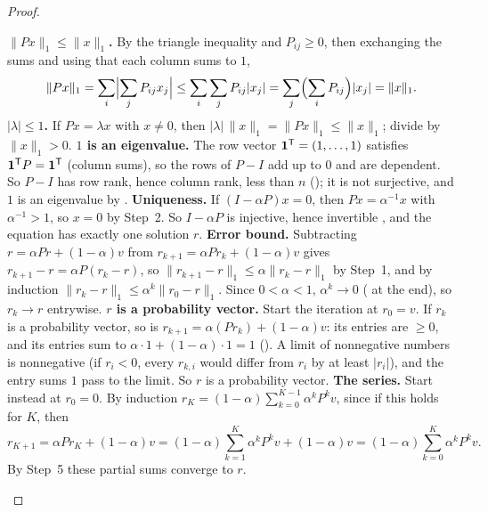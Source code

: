\documentclass[10pt]{scrartcl}
\newcommand{\one}{\mathbf 1}
\begin{document}
\begin{proof}
  \begin{steps}
    \ii \textbf{$\|Px\|_1\le\|x\|_1$.} By the triangle inequality and $P_{ij}\ge0$, then exchanging the sums and using that each column sums to $1$,
    \[
      \|Px\|_1=\sum_{i}\Bigl|\sum_{j} P_{ij}x_j\Bigr|\le\sum_{i}\sum_{j} P_{ij}|x_j|=\sum_{j}\Bigl(\sum_{i} P_{ij}\Bigr)|x_j|=\|x\|_1 .
    \]
    \ii \textbf{$|\lambda|\le1$.} If $Px=\lambda x$ with $x\ne 0$, then $|\lambda|\,\|x\|_1=\|Px\|_1\le\|x\|_1$; divide by $\|x\|_1>0$.
    \ii \textbf{$1$ is an eigenvalue.} The row vector $\one^{\T}=(1,\dots,1)$ satisfies $\one^{\T}P=\one^{\T}$ (column sums), so the rows of $P-I$ add up to $0$ and are dependent. So $P-I$ has row rank, hence column rank, less than $n$ (); it is not surjective, and $1$ is an eigenvalue by .
    \ii \textbf{Uniqueness.} If $(I-\alpha P)x=0$, then $Px=\alpha^{-1}x$ with $\alpha^{-1}>1$, so $x=0$ by Step~2. So $I-\alpha P$ is injective, hence invertible , and the equation has exactly one solution $r$.
    \ii \textbf{Error bound.} Subtracting $r=\alpha Pr+(1-\alpha)v$ from $r_{k+1}=\alpha Pr_k+(1-\alpha)v$ gives $r_{k+1}-r=\alpha P(r_k-r)$, so $\|r_{k+1}-r\|_1\le\alpha\|r_k-r\|_1$ by Step~1, and by induction $\|r_k-r\|_1\le\alpha^k\|r_0-r\|_1$. Since $0<\alpha<1$, $\alpha^k\to0$ ( at the end), so $r_k\to r$ entrywise.
    \ii \textbf{$r$ is a probability vector.} Start the iteration at $r_0=v$. If $r_k$ is a probability vector, so is $r_{k+1}=\alpha(Pr_k)+(1-\alpha)v$: its entries are $\ge0$, and its entries sum to $\alpha\cdot1+(1-\alpha)\cdot1=1$ (). A limit of nonnegative numbers is nonnegative (if $r_i<0$, every $r_{k,i}$ would differ from $r_i$ by at least $|r_i|$), and the entry sums $1$ pass to the limit. So $r$ is a probability vector.
    \ii \textbf{The series.} Start instead at $r_0=0$. By induction $r_K=(1-\alpha)\sum_{k=0}^{K-1}\alpha^kP^kv$, since if this holds for $K$, then
    \[
      r_{K+1}=\alpha P r_K+(1-\alpha)v=(1-\alpha)\sum_{k=1}^{K}\alpha^kP^kv+(1-\alpha)v=(1-\alpha)\sum_{k=0}^{K}\alpha^kP^kv.
    \] By Step~5 these partial sums converge to $r$.
  \end{steps}
\end{proof}
\end{document}
